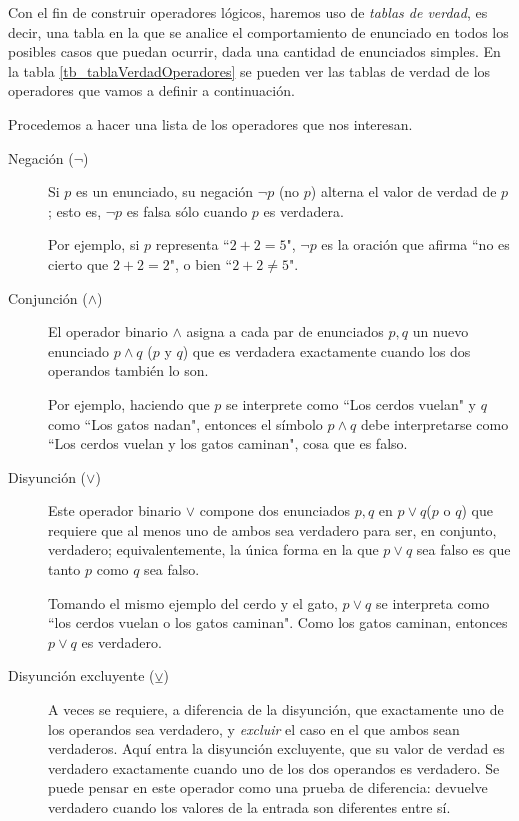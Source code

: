 \documentclass{book}
\theoremstyle{definition}
\begin{document}
Con el fin de construir operadores lógicos, haremos uso de \emph{tablas de verdad}, es decir, una tabla en la que se analice el comportamiento de enunciado en todos los posibles casos que puedan ocurrir, dada una cantidad de enunciados simples. En la tabla \ref{tb_tablaVerdadOperadores} se pueden ver las tablas de verdad de los operadores que vamos a definir a continuación.

Procedemos a hacer una lista de los operadores que nos interesan.
\begin{description}
	\item [Negación ($\neg$)]  %
	Si $p$ es un enunciado, su negación $\neg p$ (no $p$) alterna el valor de verdad de $p$; esto es, $\neg p$ es falsa sólo cuando $p$ es verdadera.
	
	Por ejemplo, si $p$ representa ``$2+2=5$", $\neg p$ es la oración que afirma ``no es cierto que $2+2=2$", o bien ``$2+2\neq 5$".

	\item[Conjunción ($\wedge$)] El operador binario $\wedge$ asigna a cada par de enunciados $p,q$ un nuevo enunciado $p \wedge q$ ($p$ y $q$) que es verdadera exactamente cuando los dos operandos también lo son.

	Por ejemplo, haciendo que $p$ se interprete como ``Los cerdos vuelan" y $q$ como ``Los gatos nadan", entonces el símbolo $p\wedge q$ debe interpretarse como ``Los cerdos vuelan y los gatos caminan", cosa que es falso.
	
	\item[Disyunción ($\vee$)] Este operador binario $\vee$ compone dos enunciados $p,q$ en $p\vee q$($p$ o $q$) que requiere que al menos uno de ambos sea verdadero para ser, en conjunto, verdadero; equivalentemente, la única forma en la que $p \vee q$ sea falso es que tanto $p$ como $q$ sea falso.
	
	Tomando el mismo ejemplo del cerdo y el gato, $p\vee q$ se interpreta como ``los cerdos vuelan o los gatos caminan".
	Como los gatos caminan, entonces $p \vee q$ es verdadero.
	
	\item[Disyunción excluyente ($\veebar$)] A veces se requiere, a diferencia de la disyunción, que exactamente uno de los operandos sea verdadero, y \emph{excluir} el caso en el que ambos sean verdaderos.
	Aquí entra la disyunción excluyente, que su valor de verdad es verdadero exactamente cuando uno de los dos operandos es verdadero.
	Se puede pensar en este operador como una prueba de diferencia: devuelve verdadero cuando los valores de la entrada son diferentes entre sí.
	

\end{description}
\end{document}
